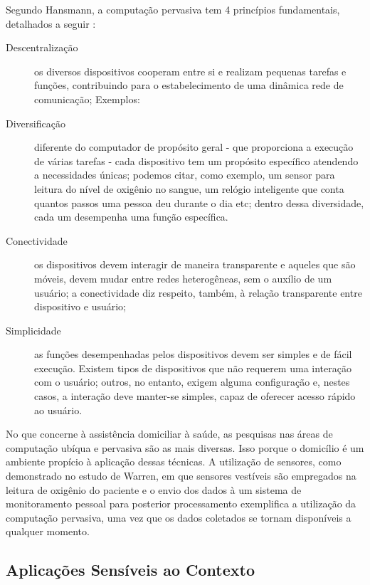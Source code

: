 
Segundo Hansmann, a computação pervasiva tem 4 princípios fundamentais,
detalhados a seguir \cite{hansmann2013pervasive}:

\begin{description}
  \item [Descentralização] os diversos dispositivos cooperam entre si e realizam
  pequenas tarefas e funções, contribuindo para o estabelecimento de uma 
  dinâmica rede de comunicação; Exemplos: 
  \item [Diversificação] diferente do computador de propósito geral - que 
  proporciona a execução de várias tarefas - cada dispositivo tem um propósito
  específico atendendo a necessidades únicas; podemos citar, como exemplo, um
  sensor para leitura do nível de oxigênio no sangue, um relógio inteligente
  que conta quantos passos uma pessoa deu durante o dia etc; dentro dessa 
  diversidade, cada um desempenha uma função específica.
  \item [Conectividade] os dispositivos devem interagir de maneira transparente
  e aqueles que são móveis, devem mudar entre redes heterogêneas, sem o 
  auxílio de um usuário; a conectividade diz respeito, também, à relação 
  transparente entre dispositivo e usuário; 
  \item [Simplicidade] as funções desempenhadas pelos dispositivos devem ser
  simples e de fácil execução. Existem tipos de dispositivos que não requerem 
  uma interação com o usuário; outros, no entanto, exigem alguma configuração e,
  nestes casos, a interação deve manter-se simples, capaz de oferecer acesso
  rápido ao usuário. 
\end{description}

No que concerne à assistência domiciliar à saúde, as pesquisas nas áreas de
computação ubíqua e pervasiva são as mais diversas. Isso porque o domicílio é um
ambiente propício à aplicação dessas técnicas. A utilização de sensores, como
demonstrado no estudo de Warren, em que sensores  vestíveis são empregados na
leitura de oxigênio do paciente e o envio dos dados à um sistema de
monitoramento pessoal para posterior processamento \cite{warren2002sensors}
exemplifica a utilização da computação pervasiva, uma  vez que os dados
coletados se tornam disponíveis a qualquer momento.

\subsection{Aplicações Sensíveis ao Contexto}\label{subsec:contexto}

